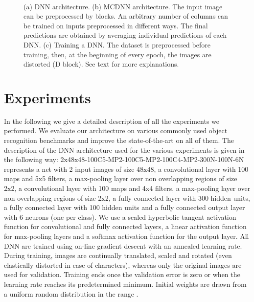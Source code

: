 \documentclass[a4paper]{article}
\begin{document}
\begin{figure}[h!]
    \centering
    \setlength{\fboxsep}{10pt}
    \setlength{\fboxrule}{0pt}
\\
    \caption{(a) DNN architecture. (b) MCDNN architecture. The input image can be preprocessed by  blocks. An arbitrary number of columns can be trained on inputs preprocessed in different ways. The final predictions are obtained by averaging individual predictions of each DNN. (c) Training a DNN.
The dataset is preprocessed before training, then, at the beginning of every epoch, the images are distorted (D block). See text for more explanations.
}
\label{fig:MCDNN}
\end{figure}


\section{Experiments}

In the following we give a detailed description of all the experiments we performed. We evaluate our architecture on various commonly used object recognition benchmarks and improve the state-of-the-art on all of them. The description of the DNN architecture used for the various experiments is given in the following way: 2x48x48-100C5-MP2-100C5-MP2-100C4-MP2-300N-100N-6N represents a net with 2 input images of size 48x48, a convolutional layer with 100 maps and 5x5 filters, a max-pooling layer over non overlapping regions of size 2x2, a convolutional layer with 100 maps and 4x4 filters, a max-pooling layer over non overlapping regions of size 2x2, a fully connected layer with 300 hidden units, a fully connected layer with 100 hidden units and a fully connected output layer with 6 neurons (one per class). We use a scaled hyperbolic tangent activation function for convolutional and fully connected layers, a linear activation function for max-pooling layers and a softmax activation function for the output layer. All DNN are trained using on-line gradient descent with an annealed learning rate. During training, images are continually translated, scaled and rotated (even elastically distorted in case of characters), whereas only the original images are used for validation. Training ends once the validation error is zero or when the learning rate reaches its predetermined minimum. Initial weights are drawn from a uniform random distribution in the range .
\end{document}
